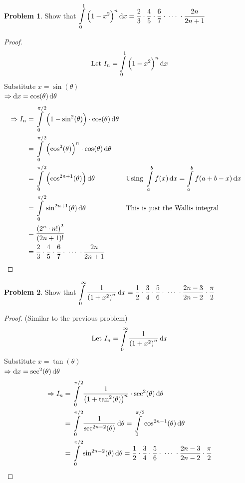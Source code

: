 \documentclass[14]{article}
\theoremstyle{definition}
\newtheorem{prob}{Problem}
\theoremstyle{case}
\begin{document}
\pagebreak
\begin{prob}
Show that $\displaystyle\int\limits_0^1 \left( 1-x^2 \right)^n \dif x = \dfrac23 \cdot \dfrac45 \cdot \dfrac67\cdot \; \cdots \; \cdot \dfrac{2n}{2n+1}$\\
\begin{proof}
\[\text{Let } I_n = \int\limits_0^1 \left( 1-x^2 \right)^n \dif x\]
Substitute $x = \sin(\theta)$\\
$\Rightarrow \dif x = \cos(\theta) \dif \theta$
\begin{align*}
\Rightarrow I_n &= \int\limits_0^{\pi/2} \left( 1 - \sin^2(\theta) \right) \cdot \cos(\theta) \dif \theta\\
&= \int\limits_0^{\pi/2} \left(\cos^2(\theta)\right)^n \cdot \cos(\theta) \dif \theta\\
&= \int\limits_0^{\pi/2} \left(\cos^{2n+1}(\theta)\right) \dif \theta && \text{Using } \int\limits_a^b f(x) \dif x = \int\limits_a^b f(a+b-x) \dif x\\
&= \int\limits_0^{\pi/2} \sin^{2n+1}(\theta) \dif \theta && \text{This is just the Wallis integral}\\
&= \dfrac{\left( 2^n \cdot n! \right)^2}{(2n+1)!}\\
&= \dfrac23 \cdot \dfrac45 \cdot \dfrac67\cdot \; \cdots \; \cdot \dfrac{2n}{2n+1}
\end{align*}
\end{proof}
\end{prob}
\begin{prob}
Show that $\displaystyle\int\limits_0^{\infty} \dfrac1{\left( 1 + x^2 \right)^n} \dif x = \dfrac12 \cdot \dfrac34 \cdot \dfrac56 \cdot \; \cdots \; \cdot \dfrac{2n-3}{2n-2} \cdot \dfrac{\pi}{2}$
\begin{proof} (Similar to the previous problem)
\[\text{Let } I_n = \int\limits_0^{\infty} \dfrac1{\left( 1 + x^2 \right)^n} \dif x\]
Substitute $x = \tan(\theta)$\\
$\Rightarrow \dif x = \sec^2(\theta) \dif \theta$
\begin{align*}
\Rightarrow I_n &= \int\limits_0^{\pi/2} \dfrac1{\left(1 + \tan^2(\theta) \right)^n} \cdot \sec^2(\theta) \dif \theta\\
&= \int\limits_0^{\pi/2}\dfrac1{\sec^{2n-2}(\theta)} \dif \theta = \int\limits_0^{\pi/2} \cos^{2n-1}(\theta) \dif \theta\\
&= \int\limits_0^{\pi/2} \sin^{2n-2}(\theta) \dif \theta = \dfrac12 \cdot \dfrac34 \cdot \dfrac56 \cdot \; \cdots \; \cdot \dfrac{2n-3}{2n-2} \cdot \dfrac{\pi}{2}
\end{align*}
\end{proof}
\end{prob}
\pagebreak
\end{document}
